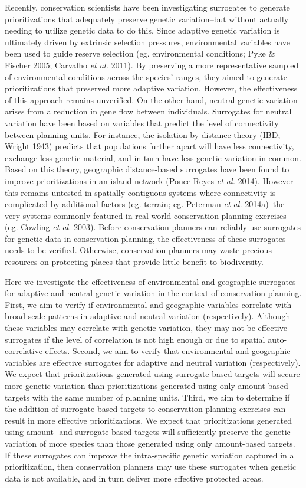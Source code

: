 \documentclass[11pt,]{article}
\begin{document}
Recently, conservation scientists have been investigating surrogates to
generate prioritizations that adequately preserve genetic variation--but
without actually needing to utilize genetic data to do this. Since
adaptive genetic variation is ultimately driven by extrinsic selection
pressures, environmental variables have been used to guide reserve
selection (eg. environmental conditions; Pyke \& Fischer 2005; Carvalho
\emph{et al.} 2011). By preserving a more representative sampled of
environmental conditions across the species' ranges, they aimed to
generate prioritizations that preserved more adaptive variation.
However, the effectiveness of this approach remains unverified. On the
other hand, neutral genetic variation arises from a reduction in gene
flow between individuals. Surrogates for neutral variation have been
based on variables that predict the level of connectivity between
planning units. For instance, the isolation by distance theory (IBD;
Wright 1943) predicts that populations further apart will have less
connectivity, exchange less genetic material, and in turn have less
genetic variation in common. Based on this theory, geographic
distance-based surrogates have been found to improve prioritizations in
an island network (Ponce-Reyes \emph{et al.} 2014). However this remains
untested in spatially contiguous systems where connectivity is
complicated by additional factors (eg. terrain; eg. Peterman \emph{et
al.} 2014a)--the very systems commonly featured in real-world
conservation planning exercises (eg. Cowling \emph{et al.} 2003). Before
conservation planners can reliably use surrogates for genetic data in
conservation planning, the effectiveness of these surrogates needs to be
verified. Otherwise, conservation planners may waste precious resources
on protecting places that provide little benefit to biodiversity.

Here we investigate the effectiveness of environmental and geographic
surrogates for adaptive and neutral genetic variation in the context of
conservation planning. First, we aim to verify if environmental and
geographic variables correlate with broad-scale patterns in adaptive and
neutral variation (respectively). Although these variables may correlate
with genetic variation, they may not be effective surrogates if the
level of correlation is not high enough or due to spatial
auto-correlative effects. Second, we aim to verify that environmental
and geographic variables are effective surrogates for adaptive and
neutral variation (respectively). We expect that prioritizations
generated using surrogate-based targets will secure more genetic
variation than prioritizations generated using only amount-based targets
with the same number of planning units. Third, we aim to determine if
the addition of surrogate-based targets to conservation planning
exercises can result in more effective prioritizations. We expect that
prioritizations generated using amount- and surrogate-based targets will
sufficiently preserve the genetic variation of more species than those
generated using only amount-based targets. If these surrogates can
improve the intra-specific genetic variation captured in a
prioritization, then conservation planners may use these surrogates when
genetic data is not available, and in turn deliver more effective
protected areas.
\end{document}
